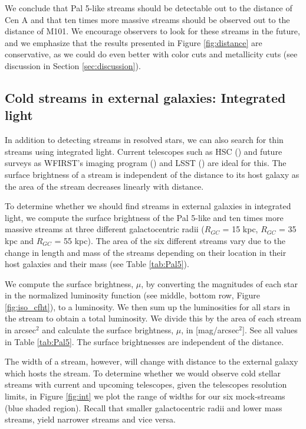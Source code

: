 \documentclass[twocolumn]{aastex62}
\begin{document}
We conclude that Pal 5-like streams should be detectable out to the distance of Cen A and that ten times more massive streams should be observed out to the distance of M101. We encourage observers to look for these streams in the future, and we emphasize that the results presented in Figure \ref{fig:distance} are conservative, as we could do even better with color cuts and metallicity cuts (see discussion in Section \ref{sec:discussion}). 

\subsection{Cold streams in external galaxies: Integrated light}
\label{sec:integrated}
In addition to detecting streams in resolved stars, we can also search for thin streams using integrated light. Current telescopes such as HSC (\citealt{miyazaki12}) and future surveys as WFIRST's imaging program (\citealt{spergel13}) and LSST  (\citealt{ivezi08}) are ideal for this. The surface brightness of a stream is independent of the distance to its host galaxy as the area of the stream decreases linearly with distance. 

To determine whether we should find streams in external galaxies in integrated light, we compute the surface brightness of the Pal 5-like and ten times more massive streams at three different galactocentric radii ($R_{GC}$ = 15  kpc, $R_{GC}$ = 35 kpc and $R_{GC}$ = 55 kpc). The area of the six different streams vary due to the change in length and mass of the streams depending on their location in their host galaxies and their mass (see Table \ref{tab:Pal5}).

We compute the surface brightness, $\mu$, by converting the magnitudes of each star in the normalized luminosity function (see middle, bottom row, Figure \ref{fig:iso_cfht}), to a luminosity. We then sum up the luminosities for all stars in the stream to obtain a total luminosity. We divide this by the area of each stream in arcsec$^2$ and calculate the surface brightness, $\mu$, in [mag/arcsec$^2$]. See all values in Table \ref{tab:Pal5}. The surface brightnesses are independent of the distance.  

The width of a stream, however, will change with distance to the external galaxy which hosts the stream. To determine whether we would observe cold stellar streams with current and upcoming telescopes, given the telescopes resolution limits, in Figure \ref{fig:int} we plot the range of widths for our six mock-streams (blue shaded region). Recall that smaller galactocentric radii and lower mass streams, yield narrower streams and vice versa. %
\end{document}
